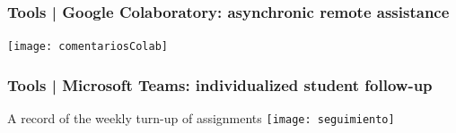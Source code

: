 \documentclass[aspectratio=169]{beamer}
\begin{document}
\begin{frame}
	\frametitle{Tools | Google Colaboratory: asynchronic remote assistance}
	\begin{block}{}
		\texttt{[image: comentariosColab]}
	\end{block}
\end{frame}



\begin{frame}
	\frametitle{Tools | Microsoft Teams: individualized student follow-up}
	\begin{block}{A record of the weekly turn-up of assignments}
		\texttt{[image: seguimiento]}
	\end{block}
\end{frame}


\end{document}
